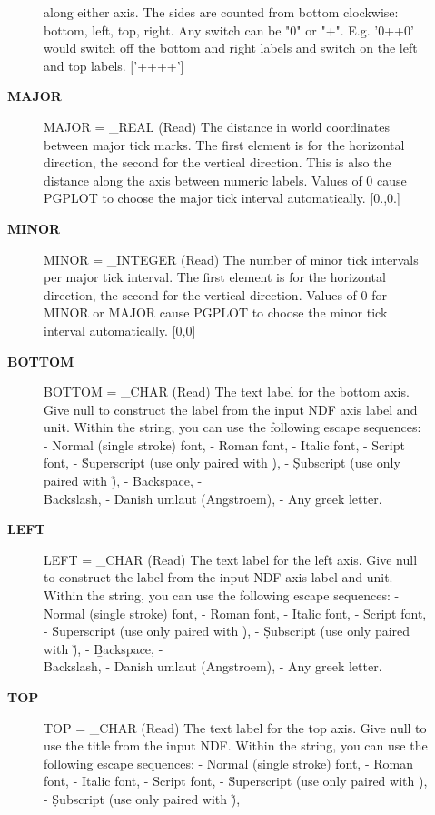 \begin{description}
\begin{description}
   along either axis. The sides are counted from bottom
   clockwise: bottom, left, top, right. Any switch can be
   "0" or "+". E.g. '0++0' would switch off the bottom and right
   labels and switch on the left and top labels. ['++++']
\item [{\bf MAJOR}]
MAJOR = _REAL (Read)
   The distance in world coordinates between major tick marks. The
   first element is for the horizontal direction, the second for
   the vertical direction. This is also the distance along the
   axis between numeric labels. Values of 0 cause PGPLOT to choose
   the major tick interval automatically. [0.,0.]
\item [{\bf MINOR}]
MINOR = _INTEGER (Read)
   The number of minor tick intervals per major tick interval. The
   first element is for the horizontal direction, the second for
   the vertical direction. Values of 0 for MINOR or MAJOR cause
   PGPLOT to choose the minor tick interval automatically. [0,0]
\item [{\bf BOTTOM}]
BOTTOM = _CHAR (Read)
   The text label for the bottom axis. Give null to construct the
   label from the input NDF axis label and unit. Within the string,
   you can use the following escape sequences:
   -  \fn Normal (single stroke) font,
   -  \fr Roman font,
   -  \fi Italic font,
   -  \fs Script font,
   -  \u  Superscript (use only paired with \d),
   -  \d  Subscript (use only paired with \u),
   -  \b  Backspace,
   -  \\  Backslash,
   -  \A  Danish umlaut (Angstroem),
   -  \g  Any greek letter.
\item [{\bf LEFT}]
LEFT = _CHAR (Read)
   The text label for the left axis. Give null to construct the
   label from the input NDF axis label and unit. Within the string,
   you can use the following escape sequences:
   -  \fn Normal (single stroke) font,
   -  \fr Roman font,
   -  \fi Italic font,
   -  \fs Script font,
   -  \u  Superscript (use only paired with \d),
   -  \d  Subscript (use only paired with \u),
   -  \b  Backspace,
   -  \\  Backslash,
   -  \A  Danish umlaut (Angstroem),
   -  \g  Any greek letter.
\item [{\bf TOP}]
TOP = _CHAR (Read)
   The text label for the top axis. Give null to use the title from
   the input NDF. Within the string, you can use the following
   escape sequences:
   -  \fn Normal (single stroke) font,
   -  \fr Roman font,
   -  \fi Italic font,
   -  \fs Script font,
   -  \u  Superscript (use only paired with \d),
   -  \d  Subscript (use only paired with \u),

\end{description}
\end{description}

